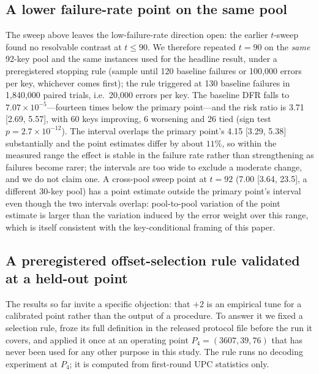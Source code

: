\documentclass[lettersize,journal]{IEEEtran}
\begin{document}
\subsection{A lower failure-rate point on the same pool}\label{sec:lowdfr}

The sweep above leaves the low-failure-rate direction open: the earlier $t$-sweep found no resolvable contrast at $t\le90$. We therefore repeated $t=90$ on the \emph{same} 92-key pool and the same instances used for the headline result, under a preregistered stopping rule (sample until 120 baseline failures or 100{,}000 errors per key, whichever comes first); the rule triggered at 130 baseline failures in 1{,}840{,}000 paired trials, i.e.\ 20{,}000 errors per key. The baseline DFR falls to $7.07\times10^{-5}$---fourteen times below the primary point---and the risk ratio is 3.71 [2.69, 5.57], with 60 keys improving, 6 worsening and 26 tied (sign test $p=2.7\times10^{-12}$). The interval overlaps the primary point's 4.15 [3.29, 5.38] substantially and the point estimates differ by about $11\%$, so within the measured range the effect is stable in the failure rate rather than strengthening as failures become rarer; the intervals are too wide to exclude a moderate change, and we do not claim one. A cross-pool sweep point at $t=92$ (7.00 [3.64, 23.5], a different 30-key pool) has a point estimate outside the primary point's interval even though the two intervals overlap: pool-to-pool variation of the point estimate is larger than the variation induced by the error weight over this range, which is itself consistent with the key-conditional framing of this paper.

\subsection{A preregistered offset-selection rule validated at a held-out point}\label{sec:rule}

The results so far invite a specific objection: that $+2$ is an empirical tune for a calibrated point rather than the output of a procedure. To answer it we fixed a selection rule, froze its full definition in the released protocol file before the run it covers, and applied it once at an operating point $P_4=(3607,39,76)$ that has never been used for any other purpose in this study. The rule runs no decoding experiment at $P_4$; it is computed from first-round UPC statistics only.
\end{document}
